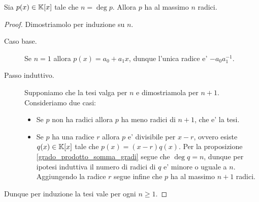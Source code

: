 \begin{proposition}
    Sia $p(x) \in \mathbb{K}[x]$ tale che $n = \deg p$. Allora $p$ ha al massimo $n$ radici.
\end{proposition}
\begin{proof}
    Dimostriamolo per induzione su $n$.
    \begin{description}
        \item[Caso base.] Se $n = 1$ allora $p(x) = a_0 + a_1x$, dunque l'unica radice e' $-a_0a_1^{-1}$.
        \item[Passo induttivo.] Supponiamo che la tesi valga per $n$ e dimostriamola per $n+1$. Consideriamo due casi: \begin{itemize}
            \item Se $p$ non ha radici allora $p$ ha meno radici di $n+1$, che e' la tesi.
            \item Se $p$ ha una radice $r$ allora $p$ e' divisibile per $x-r$, ovvero esiste $q(x) \in \mathbb{K}[x]$ tale che $p(x) = (x-r)q(x)$. Per la proposizione \ref{grado_prodotto_somma_gradi} segue che $\deg q = n$, dunque per ipotesi induttiva il numero di radici di $q$ e' minore o uguale a $n$. Aggiungendo la radice $r$ segue infine che $p$ ha al massimo $n + 1$ radici.
        \end{itemize}  
    \end{description}
    Dunque per induzione la tesi vale per ogni $n \geq 1$.
\end{proof}
